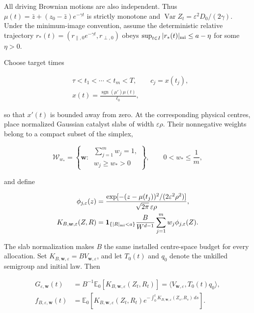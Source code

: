 \documentclass{iopjournal}
\theoremstyle{plain}
\theoremstyle{definition}
\begin{document}
All driving Brownian motions are also independent.  Thus
$\mu(t)=\bar z+(z_0-\bar z)e^{-\gamma t}$ is strictly monotone and
$\operatorname{Var}Z_t=\varepsilon^2D_0/(2\gamma)$.  Under the minimum-image
convention, assume the deterministic relative trajectory
$r_*(t)=(r_{\parallel,0}e^{-\gamma t},r_{\perp,0})$ obeys
$\sup_{t\in I}|r_*(t)|_{\rm mi}\le a-\eta$ for some $\eta>0$.

Choose target times

\begin{equation}
 \begin{aligned}
  &\tau<t_1<\cdots<t_m<T,\qquad c_j=x(t_j),\\
  &x(t)=\frac{\operatorname{sgn}(\mu')\mu(t)}{\ell_0},
 \end{aligned}
 \label{eq:exact-m-centres}
\end{equation}

so that $x'(t)$ is bounded away from zero.  At the corresponding physical
centres, place normalized Gaussian catalyst slabs of width
$\varepsilon\rho$.  Their nonnegative weights belong to a compact subset of
the simplex,

\begin{equation}
 \mathcal W_{w_*}
 =\left\{\bm w:\
   \substack{\sum_{j=1}^{m}w_j=1,\\ w_j\ge w_*>0}\right\},
 \qquad 0<w_*\le\frac1m,
 \label{eq:exact-m-simplex}
\end{equation}

and define

\begin{equation}
 \begin{aligned}
 \phi_{j,\varepsilon}(z)
 &=\frac{\exp[-(z-\mu(t_j))^2/(2\varepsilon^2\rho^2)]}
        {\sqrt{2\pi}\,\varepsilon\rho},\\
 K_{B,\bm w,\varepsilon}(Z,R)
 &=\bm1_{\{|R|_{\rm mi}<a\}}\frac{B}{W^{d-1}}
   \sum_{j=1}^{m}w_j\phi_{j,\varepsilon}(Z).
 \end{aligned}
 \label{eq:exact-m-killing}
\end{equation}

The slab normalization makes $B$ the same installed centre-space budget for
every allocation.  Set $K_{B,\bm w,\varepsilon}=B V_{\bm w,\varepsilon}$,
and let $T_0(t)$ and $q_0$ denote the unkilled semigroup and initial law.  Then

\begin{equation}
 \begin{aligned}
 G_{\varepsilon,\bm w}(t)
 &=B^{-1}\mathbb E_0[K_{B,\bm w,\varepsilon}(Z_t,R_t)]
 =\langle V_{\bm w,\varepsilon},T_0(t)q_0\rangle,\\
 f_{B,\varepsilon,\bm w}(t)
 &=\mathbb E_0\!\left[K_{B,\bm w,\varepsilon}(Z_t,R_t)
  e^{-\int_0^tK_{B,\bm w,\varepsilon}(Z_s,R_s)\,ds}\right].
 \end{aligned}
 \label{eq:exact-m-observables}
\end{equation}
\end{document}
